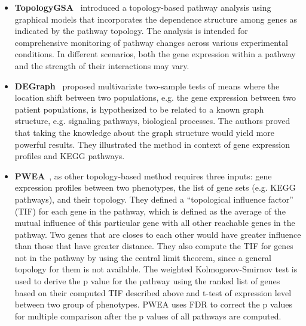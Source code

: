 \documentclass[Minh_PhD_thesis.tex]{subfiles}
\begin{document}
\begin{itemize}
\item \textbf{TopologyGSA}~\cite{Massa:2010} introduced a topology-based pathway analysis using graphical models that incorporates the dependence structure among genes as indicated by the pathway topology. The analysis is intended for comprehensive monitoring of pathway changes across various experimental conditions. In different scenarios, both the gene expression within a pathway and the strength of their interactions may vary. 

\item \textbf{DEGraph}~\cite{Jacob:2010} proposed multivariate two-sample tests of means where the location shift between two populations, e.g. the gene expression between two patient populations, is hypothesized to be related to a known graph structure, e.g. signaling pathways, biological processes. The authors proved that taking the knowledge about the graph structure would yield more powerful results. They illustrated the method in context of gene expression profiles and KEGG pathways.

\item \textbf{PWEA}~\cite{Hung:2010}, as other topology-based method requires three inputs: gene expression profiles between two phenotypes, the list of gene sets (e.g. KEGG pathways), and their topology. They defined a ``topological influence factor'' (TIF) for each gene in the pathway, which is defined as the average of the mutual influence of this particular gene with all other reachable genes in the pathway. Two genes that are closes to each other would have greater influence than those that have greater distance. They also compute the TIF for genes not in the pathway by using the central limit theorem, since a general topology for them is not available. The weighted Kolmogorov-Smirnov test is used to derive the p value for the pathway using the ranked list of genes based on their computed TIF described above and t-test of expression level between two group of phenotypes. PWEA uses FDR to correct the p values for multiple comparison after the p values of all pathways are computed.



\end{itemize}
\end{document}
